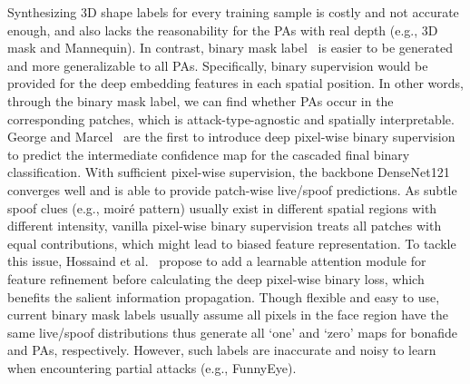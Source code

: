 \documentclass[10pt,journal,compsoc]{IEEEtran}
\begin{document}




Synthesizing 3D shape labels for every training sample is costly and not accurate enough, and also lacks the reasonability for the PAs with real depth (e.g., 3D mask and Mannequin). In contrast, binary mask label~\cite{liu2019deep,george2019deep,hossaindeeppixbis,yu2020auto2,liu2020disentangling} is easier to be generated and more generalizable to all PAs. Specifically, binary supervision would be provided for the deep embedding features in each spatial position. In other words, through the binary mask label, we can find whether PAs occur in the corresponding patches, which is attack-type-agnostic and spatially interpretable. George and Marcel~\cite{george2019deep} are the first to introduce deep pixel-wise binary supervision to predict the intermediate confidence map for the cascaded final binary classification. With sufficient pixel-wise supervision, the backbone DenseNet121 converges well and is able to provide patch-wise live/spoof predictions. As subtle spoof clues (e.g., moiré pattern) usually exist in different spatial regions with different intensity, vanilla pixel-wise binary supervision treats all patches with equal contributions, which might lead to biased feature representation. To tackle this issue, Hossaind et al.~\cite{hossaindeeppixbis} propose to add a learnable attention module for feature refinement before calculating the deep pixel-wise binary loss, which benefits the salient information propagation. Though flexible and easy to use, current binary mask labels usually assume all pixels in the face region have the same live/spoof distributions thus generate all `one' and `zero' maps for bonafide and PAs, respectively. However, such labels are inaccurate and noisy to learn when encountering partial attacks (e.g., FunnyEye).


\end{document}
